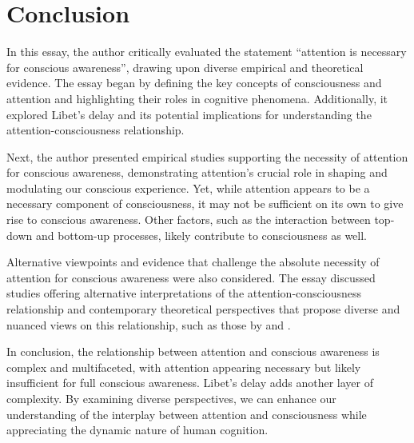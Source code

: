 \documentclass[10pt]{article}
\begin{document}
\begin{sloppypar}
  \section{Conclusion}
  \label{sec:conclusion}

  In this essay, the author critically evaluated the statement “attention is necessary for conscious awareness”, drawing upon diverse empirical and theoretical evidence. The essay began by defining the key concepts of consciousness and attention and highlighting their roles in cognitive phenomena. Additionally, it explored Libet’s delay and its potential implications for understanding the attention-consciousness relationship.

  Next, the author presented empirical studies supporting the necessity of attention for conscious awareness, demonstrating attention’s crucial role in shaping and modulating our conscious experience. Yet, while attention appears to be a necessary component of consciousness, it may not be sufficient on its own to give rise to conscious awareness. Other factors, such as the interaction between top-down and bottom-up processes, likely contribute to consciousness as well.

  Alternative viewpoints and evidence that challenge the absolute necessity of attention for conscious awareness were also considered. The essay discussed studies offering alternative interpretations of the attention-consciousness relationship and contemporary theoretical perspectives that propose diverse and nuanced views on this relationship, such as those by \cite{montemayor_types_2021} and \cite{noah_recent_2020}.

  In conclusion, the relationship between attention and conscious awareness is complex and multifaceted, with attention appearing necessary but likely insufficient for full conscious awareness. Libet’s delay adds another layer of complexity. By examining diverse perspectives, we can enhance our understanding of the interplay between attention and consciousness while appreciating the dynamic nature of human cognition.


  \pagebreak
  \singlespacing %
  
  

\end{sloppypar}
\end{document}
